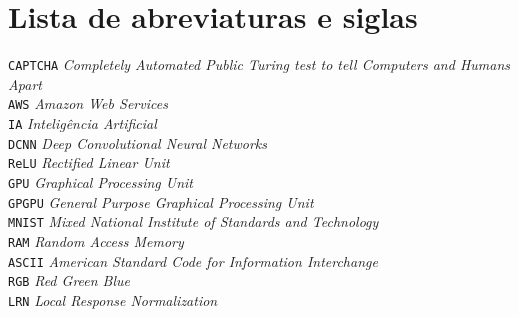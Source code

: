 
\chapter*{Lista de abreviaturas e siglas}

\noindent
\verb"CAPTCHA" \dotfill \textit{Completely Automated Public Turing
  test to tell Computers and Humans Apart}\\
\verb"AWS" \dotfill \textit{Amazon Web Services}\\
\verb"IA" \dotfill \textit{Inteligência Artificial}\\
\verb"DCNN" \dotfill \textit{Deep Convolutional Neural Networks}\\
\verb"ReLU" \dotfill \textit{Rectified Linear Unit}\\
\verb"GPU" \dotfill \textit{Graphical Processing Unit}\\
\verb"GPGPU" \dotfill \textit{General Purpose Graphical Processing
  Unit}\\
\verb"MNIST" \dotfill \textit{Mixed National Institute of Standards
  and Technology}\\
\verb"RAM" \dotfill \textit{Random Access Memory}\\
\verb"ASCII" \dotfill \textit{American Standard Code for Information
  Interchange}\\
\verb"RGB" \dotfill \textit{Red Green Blue}\\
\verb"LRN" \dotfill \textit{Local Response Normalization}\\